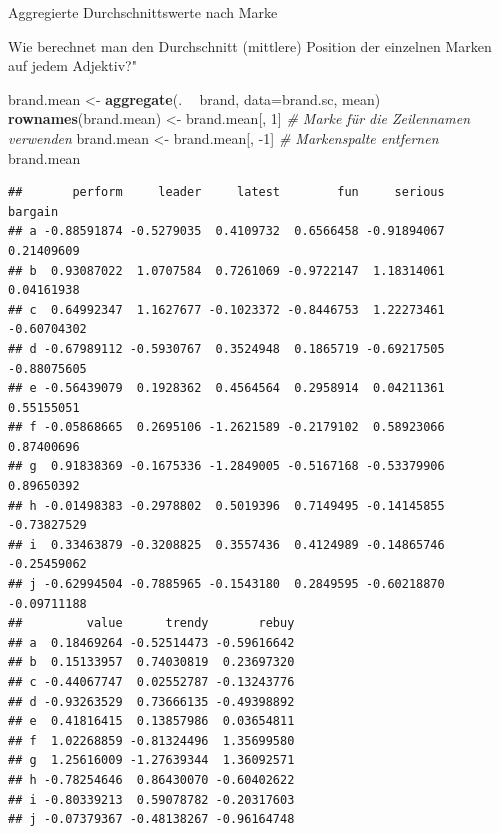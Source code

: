 \documentclass[12pt,ngerman,a4paper,ignorenonframetext,]{beamer}
\newenvironment{Shaded}{\begin{snugshade}}{\end{snugshade}}
\newcommand{\CommentTok}[1]{\textcolor[rgb]{0.56,0.35,0.01}{\textit{#1}}}
\newcommand{\DataTypeTok}[1]{\textcolor[rgb]{0.13,0.29,0.53}{#1}}
\newcommand{\DecValTok}[1]{\textcolor[rgb]{0.00,0.00,0.81}{#1}}
\newcommand{\KeywordTok}[1]{\textcolor[rgb]{0.13,0.29,0.53}{\textbf{#1}}}
\newcommand{\NormalTok}[1]{#1}
\newcommand{\OperatorTok}[1]{\textcolor[rgb]{0.81,0.36,0.00}{\textbf{#1}}}
\newcommand{\StringTok}[1]{\textcolor[rgb]{0.31,0.60,0.02}{#1}}
\begin{document}
\begin{frame}{Aggregierte Durchschnittswerte nach Marke}
\protect\hypertarget{aggregierte-durchschnittswerte-nach-marke}{}

Wie berechnet man den Durchschnitt (mittlere) Position der einzelnen
Marken auf jedem Adjektiv?"

\begin{Shaded}
\begin{Highlighting}[]
\NormalTok{brand.mean <-}\StringTok{ }\KeywordTok{aggregate}\NormalTok{(. }\OperatorTok{~}\StringTok{ }\NormalTok{brand, }\DataTypeTok{data=}\NormalTok{brand.sc, mean)}
\KeywordTok{rownames}\NormalTok{(brand.mean) <-}\StringTok{ }\NormalTok{brand.mean[, }\DecValTok{1}\NormalTok{] }\CommentTok{# Marke für die Zeilennamen verwenden}
\NormalTok{brand.mean <-}\StringTok{ }\NormalTok{brand.mean[, }\DecValTok{-1}\NormalTok{]          }\CommentTok{# Markenspalte entfernen}
\NormalTok{brand.mean}
\end{Highlighting}
\end{Shaded}

\begin{verbatim}
##       perform     leader     latest        fun     serious     bargain
## a -0.88591874 -0.5279035  0.4109732  0.6566458 -0.91894067  0.21409609
## b  0.93087022  1.0707584  0.7261069 -0.9722147  1.18314061  0.04161938
## c  0.64992347  1.1627677 -0.1023372 -0.8446753  1.22273461 -0.60704302
## d -0.67989112 -0.5930767  0.3524948  0.1865719 -0.69217505 -0.88075605
## e -0.56439079  0.1928362  0.4564564  0.2958914  0.04211361  0.55155051
## f -0.05868665  0.2695106 -1.2621589 -0.2179102  0.58923066  0.87400696
## g  0.91838369 -0.1675336 -1.2849005 -0.5167168 -0.53379906  0.89650392
## h -0.01498383 -0.2978802  0.5019396  0.7149495 -0.14145855 -0.73827529
## i  0.33463879 -0.3208825  0.3557436  0.4124989 -0.14865746 -0.25459062
## j -0.62994504 -0.7885965 -0.1543180  0.2849595 -0.60218870 -0.09711188
##         value      trendy       rebuy
## a  0.18469264 -0.52514473 -0.59616642
## b  0.15133957  0.74030819  0.23697320
## c -0.44067747  0.02552787 -0.13243776
## d -0.93263529  0.73666135 -0.49398892
## e  0.41816415  0.13857986  0.03654811
## f  1.02268859 -0.81324496  1.35699580
## g  1.25616009 -1.27639344  1.36092571
## h -0.78254646  0.86430070 -0.60402622
## i -0.80339213  0.59078782 -0.20317603
## j -0.07379367 -0.48138267 -0.96164748
\end{verbatim}

\end{frame}
\end{document}
